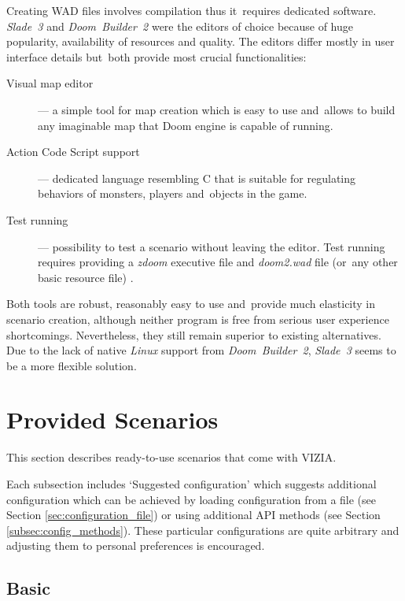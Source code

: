 \documentclass[english,bachelor,a4paper,twoside]{ppfcmthesis}
\begin{document}
	Creating WAD files involves compilation thus it~requires dedicated software. \emph{Slade~3} and \emph{Doom~Builder~2} were the editors of choice because of huge popularity, availability of resources and quality. The editors differ mostly in user interface details but~both provide most crucial functionalities:

	\begin{description}
		\item [Visual map editor] --- a simple tool for map creation which is easy to use and~allows to build any imaginable map that Doom engine is capable of running.
		\item [Action Code Script support] --- dedicated language resembling C that is suitable for regulating behaviors of monsters, players and~objects in the game.
		\item [Test running] --- possibility to test a scenario without leaving the editor. Test running requires providing a \emph{zdoom} executive file and \emph{doom2.wad} file (or~any other basic resource file) . 
	\end{description}

	Both tools are robust, reasonably easy to use and~provide much elasticity in scenario creation, although neither program is free from serious user experience shortcomings. Nevertheless, they still remain superior to existing alternatives. Due to the lack of native \emph{Linux} support from \emph{Doom~Builder~2}, \emph{Slade~3} seems to be a more flexible solution. 

	\newpage
\section{Provided Scenarios}\label{sec:scenarios}
	This section describes ready-to-use scenarios that come with VIZIA.

	Each subsection includes `Suggested configuration' which suggests additional configuration which can be achieved by loading	configuration from a file (see Section \ref{sec:configuration_file}) or using additional API methods (see Section \ref{subsec:config_methods}). These particular configurations are quite arbitrary and adjusting them to personal preferences is encouraged.

	\subsection{Basic}\label{subsec:basic}
		
\end{document}
